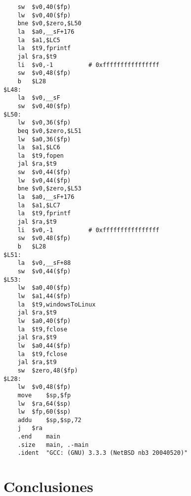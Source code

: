 \documentclass[a4paper,11pt]{article}
\begin{document}
\begin{verbatim}
	sw	$v0,40($fp)
	lw	$v0,40($fp)
	bne	$v0,$zero,$L50
	la	$a0,__sF+176
	la	$a1,$LC5
	la	$t9,fprintf
	jal	$ra,$t9
	li	$v0,-1			# 0xffffffffffffffff
	sw	$v0,48($fp)
	b	$L28
$L48:
	la	$v0,__sF
	sw	$v0,40($fp)
$L50:
	lw	$v0,36($fp)
	beq	$v0,$zero,$L51
	lw	$a0,36($fp)
	la	$a1,$LC6
	la	$t9,fopen
	jal	$ra,$t9
	sw	$v0,44($fp)
	lw	$v0,44($fp)
	bne	$v0,$zero,$L53
	la	$a0,__sF+176
	la	$a1,$LC7
	la	$t9,fprintf
	jal	$ra,$t9
	li	$v0,-1			# 0xffffffffffffffff
	sw	$v0,48($fp)
	b	$L28
$L51:
	la	$v0,__sF+88
	sw	$v0,44($fp)
$L53:
	lw	$a0,40($fp)
	lw	$a1,44($fp)
	la	$t9,windowsToLinux
	jal	$ra,$t9
	lw	$a0,40($fp)
	la	$t9,fclose
	jal	$ra,$t9
	lw	$a0,44($fp)
	la	$t9,fclose
	jal	$ra,$t9
	sw	$zero,48($fp)
$L28:
	lw	$v0,48($fp)
	move	$sp,$fp
	lw	$ra,64($sp)
	lw	$fp,60($sp)
	addu	$sp,$sp,72
	j	$ra
	.end	main
	.size	main, .-main
	.ident	"GCC: (GNU) 3.3.3 (NetBSD nb3 20040520)"
\end{verbatim}

\section{Conclusiones}
\end{document}
